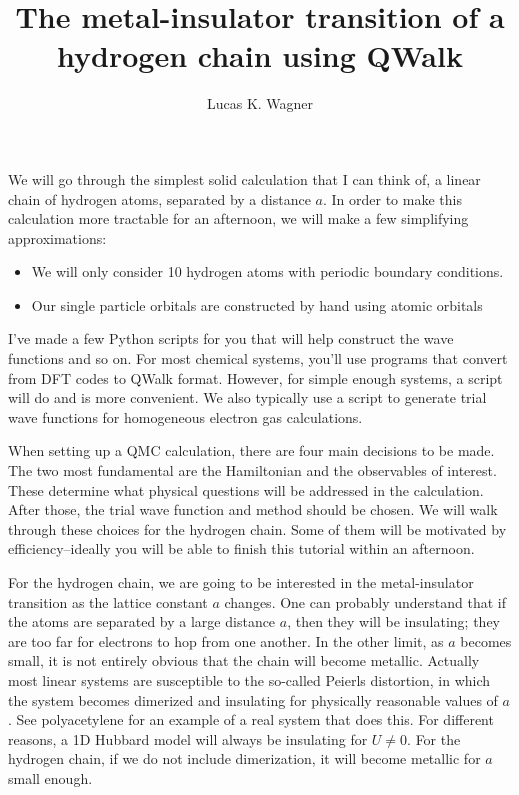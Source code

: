 \documentclass[12pt]{article}
\begin{document}
\title{The metal-insulator transition of a hydrogen chain using QWalk}
\author{Lucas K. Wagner}
\maketitle

We will go through the simplest solid calculation that I can think of, a linear chain of hydrogen atoms, separated by a distance $a$. 
In order to make this calculation more tractable for an afternoon, we will make a few simplifying approximations:
\begin{itemize}
\item We will only consider 10 hydrogen atoms with periodic boundary conditions.
\item Our single particle orbitals are constructed by hand using atomic orbitals
\end{itemize}

I've made a few Python scripts for you that will help construct the wave functions and so on. 
For most chemical systems, you'll use programs that convert from DFT codes to QWalk format.
However, for simple enough systems, a script will do and is more convenient.
We also typically use a script to generate trial wave functions for homogeneous electron gas calculations.

When setting up a QMC calculation, there are four main decisions to be made. 
The two most fundamental are the Hamiltonian and the observables of interest.
These determine what physical questions will be addressed in the calculation.
After those, the trial wave function and method should be chosen. 
We will walk through these choices for the hydrogen chain.
Some of them will be motivated by efficiency--ideally you will be able to finish this tutorial within an afternoon.

For the hydrogen chain, we are going to be interested in the metal-insulator transition as the lattice constant $a$ changes.
One can probably understand that if the atoms are separated by a large distance $a$, then they will be insulating; they are too far for electrons to hop from one another.
In the other limit, as $a$ becomes small, it is not entirely obvious that the chain will become metallic.
Actually most linear systems are susceptible to the so-called Peierls distortion, in which the system becomes dimerized and insulating for physically reasonable values of $a$. 
See polyacetylene for an example of a real system that does this.
For different reasons, a 1D Hubbard model will always be insulating for $U\neq 0$.
For the hydrogen chain, if we do not include dimerization, it will become metallic for $a$ small enough.
\end{document}
